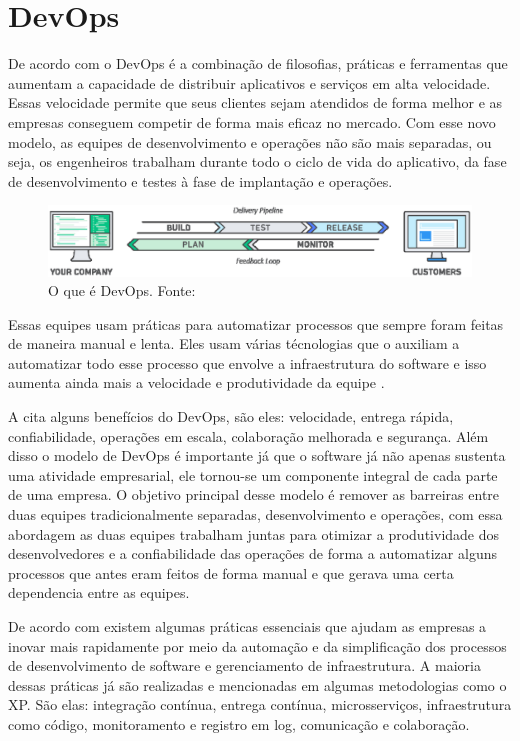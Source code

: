 \section{DevOps}

De acordo com \cite{amazon} o DevOps é a combinação de filosofias, práticas e ferramentas que aumentam a capacidade de
distribuir aplicativos e serviços em alta velocidade. Essas velocidade permite que seus clientes sejam atendidos de
forma melhor e as empresas conseguem competir de forma mais eficaz no mercado. Com esse novo modelo, as equipes de
desenvolvimento e operações não são mais separadas, ou seja, os engenheiros trabalham durante todo o ciclo de vida do
aplicativo, da fase de desenvolvimento e testes à fase de implantação e operações.

\begin{figure}[H]
	\centering
  \includegraphics[keepaspectratio=true,scale=0.5]{figuras/devops_pipe.eps}
  \caption[O que é DevOps.]{O que é DevOps. Fonte: \cite{amazon}}
	\label{fig:desenvolvimento}
\end{figure}

Essas equipes usam práticas para automatizar processos que sempre foram feitas de maneira manual e lenta. Eles usam
várias técnologias que o auxiliam a automatizar todo esse processo que envolve a infraestrutura do software e isso
aumenta ainda mais a velocidade e produtividade da equipe \cite{amazon}.

A \cite{amazon} cita alguns benefícios do DevOps, são eles: velocidade, entrega rápida, confiabilidade, operações em
escala, colaboração melhorada e segurança. Além disso o modelo de DevOps é importante já que o software já não apenas
sustenta uma atividade empresarial, ele tornou-se um componente integral de cada parte de uma empresa. O objetivo
principal desse modelo é remover as barreiras entre duas equipes tradicionalmente separadas, desenvolvimento e
operações, com essa abordagem as duas equipes trabalham juntas para otimizar a produtividade dos desenvolvedores e a
confiabilidade das operações de forma a automatizar alguns processos que antes eram feitos de forma manual e que gerava
uma certa dependencia entre as equipes.

De acordo com \cite{amazon} existem algumas práticas essenciais que ajudam as empresas a inovar mais rapidamente por
meio da automação e da simplificação dos processos de desenvolvimento de software e gerenciamento de infraestrutura. A
maioria dessas práticas já são realizadas e mencionadas em algumas metodologias como o XP. São elas: integração
contínua, entrega contínua, microsserviços, infraestrutura como código, monitoramento e registro em log, comunicação e
colaboração.
